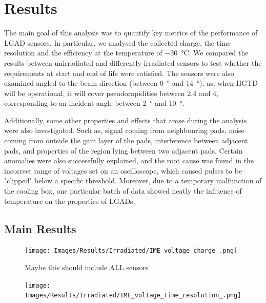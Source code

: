 \chapter{Results}

The main goal of this analysis was to quantify key metrics of the performance of LGAD sensors. In particular, we analysed the collected charge, the time resolution and the efficiency at the temperature of \qty{-30}{\degreeCelsius}. We compared the results between unirradiated and differently irradiated sensors to test whether the requirements at start and end of life were satisfied. The sensors were also examined angled to the beam direction (between \qty{0}{\degree} and \qty{14}{\degree}), as, when HGTD will be operational, it will cover pseudorapidities between $2.4$ and $4$, corresponding to an incident angle between \qty{2}{\degree} and \qty{10}{\degree}.

Additionally, some other properties and effects that arose during the analysis were also investigated. Such as, signal coming from neighbouring pads, noise coming from outside the gain layer of the pads, interference between adjacent pads, and properties of the region lying between two adjacent pads. Certain anomalies were also successfully explained, and the root cause was found in the incorrect range of voltages set on an oscilloscope, which caused pulses to be "clipped" below a specific threshold. Moreover, due to a temporary malfunction of the cooling box, one particular batch of data showed neatly the influence of temperature on the properties of LGADs.



\section{Main Results}

\begin{figure}[h!tbp]
    \centering
    \texttt{[image: Images/Results/Irradiated/IME\_voltage\_charge\_.png]}
    \captionsetup{width=\captionwidth}
    \caption{Maybe this should include ALL sensors}
    \label{fig:irradiated_IME_voltage_charge}
\end{figure}


\begin{figure}[h!tbp]
    \centering
    \texttt{[image: Images/Results/Irradiated/IME\_voltage\_time\_resolution\_.png]}
    \captionsetup{width=\captionwidth}
    \caption{}
    \label{fig:irradiated_IME_voltage_time_res}
\end{figure}

